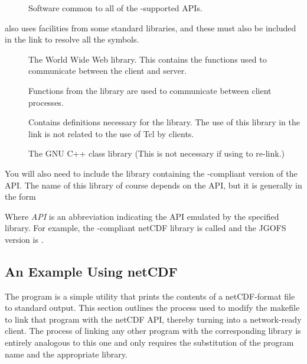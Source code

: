 \begin{description}
\item[] Software common to all of the \opendap-supported
  APIs.
\end{description}

\opendap also uses facilities from some standard libraries, and these must
also be included in the link to resolve all the symbols.

\begin{description}
\item[] The World Wide Web library.  This contains the functions used to communicate
  between the \opendap client and server.

\item[] Functions from the 
library are used to communicate between
\opendap client processes. 

\item[] Contains definitions necessary for the
   library.  The use of this library in the link is not
  related to the use of Tcl by \opendap clients.  
  
\item[] 
  The GNU C++ class library (This is not necessary if using 
  to re-link.) 

\end{description}

You will also need to include the library containing the
\opendap-compliant version of the API. The name of this library of course
depends on the API, but it is generally in the form

\begin{example}
\end{example}

Where {\em API} is an abbreviation indicating the API emulated by the
specified library.  For example, the \opendap-compliant netCDF library is
called  and the JGOFS version is .

\subsection{An Example Using netCDF}
\label{opd-client,link-example}

The  program is a simple utility that prints the contents
of a netCDF-format file to standard output.  This section outlines the
process used to modify the  makefile to link that program
with the \opendap netCDF API, thereby turning  into a
network-ready \opendap client. The process of linking any other program
with the corresponding \opendap library is entirely analogous to this one
and only requires the substitution of the program name and the
appropriate library.

